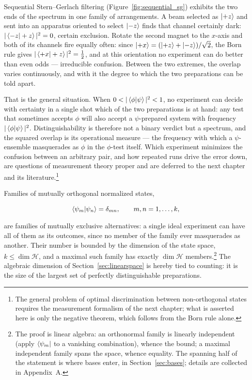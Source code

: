 Sequential Stern--Gerlach filtering (Figure~\ref{fig:sequential_sg}) exhibits the two ends of the spectrum in one family of arrangements. A beam selected as $\ket{+z}$ and sent into an apparatus oriented to select $\ket{-z}$ finds that channel certainly dark: $|\braket{-z|+z}|^2=0$, certain exclusion. Rotate the second magnet to the $x$-axis and both of its channels fire equally often: since $\ket{+x}=(\ket{+z}+\ket{-z})/\sqrt{2}$, the Born rule gives $|\braket{+x|+z}|^2=\tfrac12$, and at this orientation no experiment can do better than even odds --- irreducible confusion. Between the two extremes, the overlap varies continuously, and with it the degree to which the two preparations can be told apart.

That is the general situation. When $0<|\braket{\phi|\psi}|^2<1$, no experiment can decide with certainty in a single shot which of the two preparations is at hand: any test that sometimes accepts $\phi$ will also accept a $\psi$-prepared system with frequency $|\braket{\phi|\psi}|^2$. Distinguishability is therefore not a binary verdict but a spectrum, and the squared overlap is its operational measure --- the frequency with which a $\psi$-ensemble masquerades as $\phi$ in the $\phi$-test itself. Which experiment minimizes the confusion between an arbitrary pair, and how repeated runs drive the error down, are questions of measurement theory proper and are deferred to the next chapter and its literature.\footnote{The general problem of optimal discrimination between non-orthogonal states requires the measurement formalism of the next chapter; what is asserted here is only the negative theorem, which follows from the Born rule alone.}

Families of mutually orthogonal normalized states,
\begin{linenomath}
\begin{equation}
    \braket{\psi_m|\psi_n}=\delta_{mn},
    \qquad
    m,n=1,\dots,k,
\end{equation}
\end{linenomath}
are families of mutually exclusive alternatives: a single ideal experiment can have all of them as its outcomes, since no member of the family ever masquerades as another. Their number is bounded by the dimension of the state space, $k\leq\dim\mathcal{H}$, and a maximal such family has exactly $\dim\mathcal{H}$ members.\footnote{The proof is linear algebra: an orthonormal family is linearly independent (apply $\bra{\psi_m}$ to a vanishing combination), whence the bound; a maximal independent family spans the space, whence equality. The spanning half of the statement is where bases enter, in Section~\ref{sec:bases}; details are collected in Appendix~A.} The algebraic dimension of Section~\ref{sec:linearspace} is hereby tied to counting: it is the size of the largest set of perfectly distinguishable preparations.

